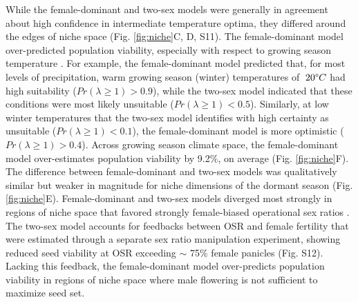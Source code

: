 \documentclass[9pt,twocolumn,twoside,lineno]{pnas-new}
\newcommand{\revise}[1]{{\color{Mahogany}{#1}}}
\begin{document}
While the female-dominant and two-sex models were generally in agreement about high confidence in intermediate temperature optima, they differed around the edges of niche space (Fig. \ref{fig:niche}C, D, S11). 
The female-dominant model over-predicted population viability, especially with respect to growing season temperature \revise {(Fig. \ref{fig:niche}E, F)}.
For example, the female-dominant model predicted that, for most levels of precipitation, warm growing season (winter) temperatures of $\> 20\degree C$ had high suitability ($Pr(\lambda \ge 1) > 0.9$), while the two-sex model indicated that these conditions were most likely unsuitable ($Pr(\lambda \ge 1) < 0.5$). 
Similarly, at low winter temperatures that the two-sex model identifies with high certainty as unsuitable ($Pr(\lambda \ge 1) < 0.1$), the female-dominant model is more optimistic ($Pr(\lambda \ge 1) > 0.4$). 
Across growing season climate space, the female-dominant model over-estimates population viability by 9.2\%, on average (Fig. \ref{fig:niche}F). 
The difference between female-dominant and two-sex models was qualitatively similar but weaker in magnitude for niche dimensions of the dormant season (Fig. \ref{fig:niche}E).
Female-dominant and two-sex models diverged most strongly in regions of niche space that favored strongly female-biased operational sex ratios \revise {(Fig. S16 to S19)}.
The two-sex model accounts for feedbacks between OSR and female fertility that were estimated through a separate sex ratio manipulation experiment, showing reduced seed viability at OSR exceeding $\sim$ 75\% female panicles (Fig. S12).
Lacking this feedback, the female-dominant model over-predicts population viability in regions of niche space where male flowering is not sufficient to maximize seed set. 
\end{document}
